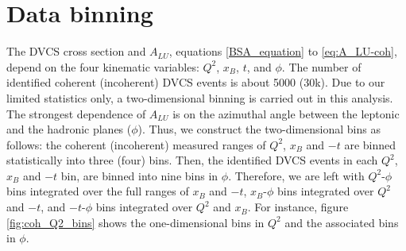 \section{Data binning}
The DVCS cross section and $A_{LU}$, equations \ref{BSA_equation} to 
\ref{eq:A_LU-coh}, depend on the four kinematic variables: $Q^{2}$, $x_{B}$, 
$t$, and $\phi$. The number of identified coherent (incoherent) DVCS events is 
about 5000 (30k). Due to our limited statistics only, a two-dimensional binning 
is carried out in this analysis.  The strongest dependence of $A_{LU}$ is on 
the azimuthal angle between the leptonic and the hadronic planes ($\phi$).  
Thus, we construct the two-dimensional bins as follows: the coherent 
(incoherent) measured ranges of $Q^{2}$, $x_{B}$ and $-t$ are binned 
statistically into three (four) bins.  Then, the identified DVCS events in each 
$Q^{2}$, $x_{B}$ and $-t$ bin, are binned into nine bins in $\phi$.  Therefore, 
we are left with $Q^2$-$\phi$ bins integrated over the full ranges of $x_{B}$ 
and $-t$, $x_{B}$-$\phi$ bins integrated over $Q^2$ and $-t$, and $-t$-$\phi$ 
bins integrated over $Q^2$ and $x_{B}$. For instance, figure 
\ref{fig:coh_Q2_bins} shows the one-dimensional bins in $Q^2$ and the 
associated bins in $\phi$.

